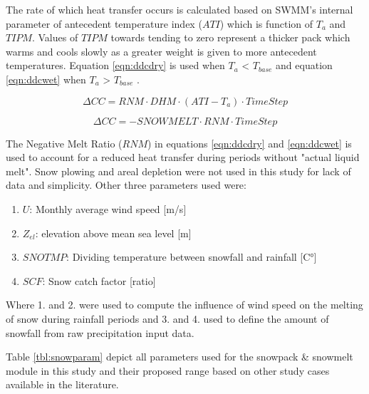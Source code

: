 The rate of which heat transfer occurs is calculated based on SWMM's internal parameter of antecedent temperature index ($ATI$) which is function of $T_a$ and $TIPM$. Values of $TIPM$ towards tending to zero represent a thicker pack which warms and cools slowly as a greater weight is given to more antecedent temperatures. Equation \ref{eqn:ddcdry} is used when $T_a$ < $T_{base}$ and equation \ref{eqn:ddcwet} when $T_a$ > $T_{base}$ \cite{Rossman2016}. 

\begin{equation}
\label{eqn:ddcdry}
\Delta CC = RNM \cdot DHM \cdot (ATI - T_a) \cdot Time Step
\end{equation}

\begin{equation}
\label{eqn:ddcwet}
\Delta CC = - SNOWMELT \cdot RNM \cdot Time Step
\end{equation}

The Negative Melt Ratio ($RNM$) in equations \ref{eqn:ddcdry} and \ref{eqn:ddcwet} is used to account for a reduced heat transfer during periods without "actual liquid melt".
Snow plowing and areal depletion were not used in this study for lack of data and simplicity.
Other three parameters used were:

\begin{enumerate}
    \item $U$: Monthly average wind speed [m/s]
    \item $Z_{el}$: elevation above mean sea level [m]
    \item $SNOTMP$: Dividing temperature between snowfall and rainfall [C°]
    \item $SCF$: Snow catch factor [ratio]
\end{enumerate}

Where 1. and 2. were used to compute the influence of wind speed on the melting of snow during rainfall periods and 3. and 4. used to define the amount of snowfall from raw precipitation input data.



Table \ref{tbl:snowparam} depict all parameters used for the snowpack \& snowmelt module in this study and their proposed range based on other study cases available in the literature. 


